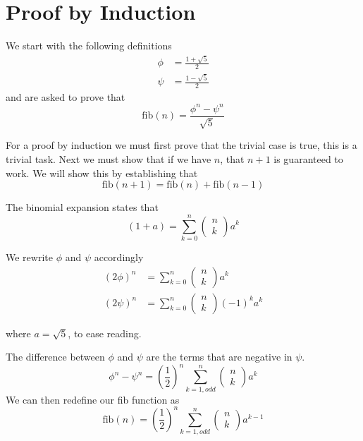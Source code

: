 \documentclass[]{amsart}
\begin{document}
\section{Proof by Induction}

We start with the following definitions
\begin{align}
    \phi    &= \frac{1 + \sqrt{5}}{2} \\
    \psi    &= \frac{1 - \sqrt{5}}{2}
\end{align}
and are asked to prove that
\begin{equation}
    \mathrm{fib}(n) = \frac{\phi^n - \psi^n}{\sqrt{5}}
\end{equation}

For a proof by induction we must first prove that the trivial case is true, this is a trivial task.
Next we must show that if we have $n$, that $n+1$ is guaranteed to work.
We will show this by establishing that
\begin{equation}
    \mathrm{fib}(n+1) = \mathrm{fib}(n) +  \mathrm{fib}(n-1)
\end{equation}

The binomial expansion states that
\begin{equation}
    \left(1 + a\right) = \sum_{k=0}^{n} \left(\begin{array}{c} n \\ k \end{array} \right) a^k
\end{equation}

We rewrite  $\phi$ and $\psi$ accordingly
\begin{align}
    \left(2\phi\right)^n    &= \sum_{k=0}^{n} \left(\begin{array}{c} n \\ k \end{array} \right) a^k \\
    \left(2\psi\right)^n  &= \sum_{k=0}^{n} \left(\begin{array}{c} n \\ k \end{array} \right) (-1)^{k} a^k
\end{align}

where $a = \sqrt{5}$, to ease reading.

The difference between $\phi$ and $\psi$ are the terms that are negative in $\psi$.
\begin{equation}
    \phi^n-\psi^n = \left(\dfrac{1}{2}\right)^n \sum_{k=1,odd}^{n} \left(\begin{array}{c} n \\ k \end{array} \right) a^k
\end{equation}
We can then redefine our fib function as
\begin{equation}
    \mathrm{fib}(n) = \left(\dfrac{1}{2}\right)^n \sum_{k=1,odd}^{n} \left(\begin{array}{c} n \\ k \end{array} \right) a^{k-1}
\end{equation}
\end{document}
